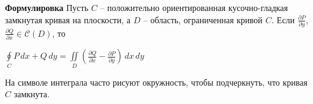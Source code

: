 


\textbf{Формулировка}
Пусть $C$ -- положительно ориентированная кусочно-гладкая замкнутая кривая на плоскости, а $D$ -- область, ограниченная кривой $C$. 
Если 
$\frac{\partial P}{\partial y}$, $\frac{\partial Q}{\partial x} \in \mathcal{C}(D)$, то

$\oint\limits_{C} P \,dx + Q \,dy = \iint\limits_{D} \left( \frac{\partial Q}{\partial x} - \frac{\partial P}{\partial y} \right) \,dx\,dy$

На символе интеграла часто рисуют окружность, чтобы подчеркнуть, что кривая $C$ замкнута.

